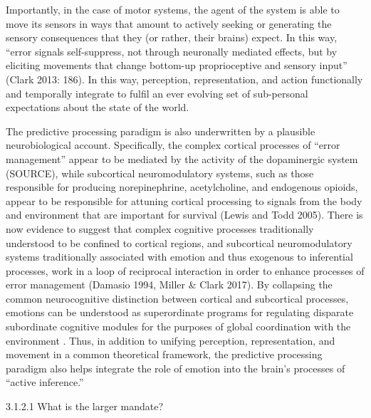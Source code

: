     Importantly, in the case of motor systems, the agent of the system is able to move its sensors in ways that amount to actively seeking or generating the sensory consequences that they (or rather, their brains) expect.  In this way, ``error signals self-suppress, not through neuronally mediated effects, but by eliciting movements that change bottom-up proprioceptive and sensory input'' (Clark 2013: 186). In this way, perception, representation, and action functionally and temporally integrate to fulfil an ever evolving set of sub-personal expectations about the state of the world.

    The predictive processing paradigm is also underwritten by a plausible neurobiological account. Specifically, the complex cortical processes of ``error management'' appear to be mediated by the activity of the dopaminergic system (SOURCE), while subcortical neuromodulatory systems, such as those responsible for producing norepinephrine, acetylcholine, and endogenous opioids, appear to be responsible for attuning cortical processing to signals from the body and environment that are important for survival (Lewis and Todd 2005).  There is now evidence to suggest that complex cognitive processes traditionally understood to be confined to cortical regions, and subcortical neuromodulatory systems traditionally associated with emotion and thus exogenous to inferential processes, work in a loop of reciprocal interaction in order to enhance processes of error management (Damasio 1994, Miller & Clark 2017).  By collapsing the common neurocognitive distinction between cortical and subcortical processes, emotions can be understood as superordinate programs for regulating disparate subordinate cognitive modules for the purposes of global coordination with the environment \citep{Cosmides2000}.  Thus, in addition to unifying perception, representation, and movement in a common theoretical framework, the predictive processing paradigm also helps integrate the role of emotion into the brain's processes of ``active inference.''


          3.1.2.1 What is the larger mandate?

